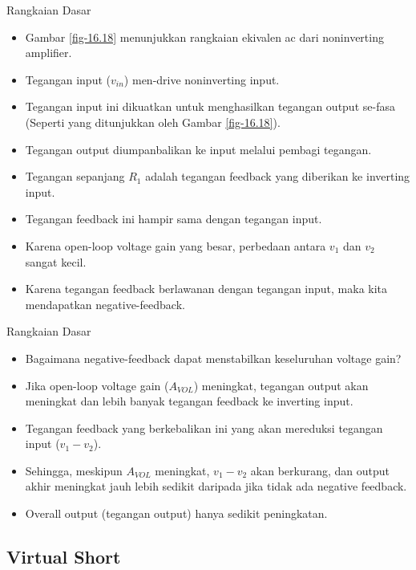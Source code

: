 \begin{frame}{Rangkaian Dasar}
	\begin{itemize}
		\item Gambar \ref{fig-16.18} menunjukkan rangkaian ekivalen ac dari noninverting amplifier.
		\item Tegangan input ($ v_{in} $) men-drive noninverting input.
		\item Tegangan input ini dikuatkan untuk menghasilkan tegangan output se-fasa (Seperti yang ditunjukkan oleh Gambar \ref{fig-16.18}).
		\item Tegangan output diumpanbalikan ke input melalui pembagi tegangan.
		\item Tegangan sepanjang $ R_1 $ adalah tegangan feedback yang diberikan ke inverting input.
		\item Tegangan feedback ini hampir sama dengan tegangan input.
		\item Karena open-loop voltage gain yang besar, perbedaan antara $ v_1 $ dan $ v_2 $ sangat kecil.
		\item Karena tegangan feedback berlawanan dengan tegangan input, maka kita mendapatkan negative-feedback.
	\end{itemize}
\end{frame}

\begin{frame}{Rangkaian Dasar}
	\begin{itemize}
		\item Bagaimana negative-feedback dapat menstabilkan keseluruhan voltage gain?
		\item Jika open-loop voltage gain ($ A_{VOL} $) meningkat, tegangan output akan meningkat dan lebih banyak tegangan feedback ke inverting input.
		\item Tegangan feedback yang berkebalikan ini yang akan mereduksi tegangan input ($ v_1 - v_2 $).
		\item Sehingga, meskipun $ A_{VOL} $ meningkat, $ v_1 - v_2 $ akan berkurang, dan output akhir meningkat jauh lebih sedikit daripada jika tidak ada negative feedback. 
		\item Overall output (tegangan output) hanya sedikit peningkatan.
	\end{itemize}
\end{frame}



\subsection{Virtual Short}


